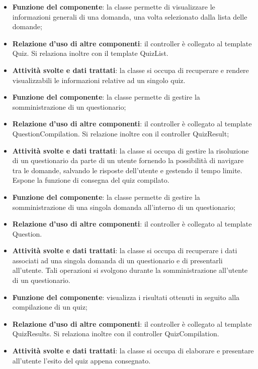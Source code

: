 \begin{itemize}
	\item\textbf{Funzione del componente}: la classe permette di visualizzare le informazioni generali di una domanda, una volta selezionato dalla lista delle domande;
	\item\textbf{Relazione d'uso di altre componenti}: il controller è collegato al template Quiz. Si relaziona inoltre con il template QuizList.
	\item\textbf{Attività svolte e dati trattati}: la classe si occupa di recuperare e rendere visualizzabili le informazioni relative ad un singolo quiz.
\end{itemize}


\begin{itemize}
	\item\textbf{Funzione del componente}: la classe permette di gestire la somministrazione di un questionario;
	\item\textbf{Relazione d'uso di altre componenti}: il controller è collegato al template QuestionCompilation. Si relazione inoltre con il controller QuizResult;
	\item\textbf{Attività svolte e dati trattati}: la classe si occupa di gestire la risoluzione di un questionario da parte di un utente fornendo la possibilità di navigare tra le domande, salvando le risposte dell'utente e gestendo il tempo limite. Espone la funzione di consegna del quiz compilato.
\end{itemize}


\begin{itemize}
	\item\textbf{Funzione del componente}: la classe permette di gestire la somministrazione di una singola domanda all'interno di un questionario;
	\item\textbf{Relazione d'uso di altre componenti}: il controller è collegato al template Question.
	\item\textbf{Attività svolte e dati trattati}: la classe si occupa di recuperare i dati associati ad una singola domanda di un questionario e di presentarli all'utente. Tali operazioni si svolgono durante la somministrazione all'utente di un questionario.
\end{itemize}


\begin{itemize}
	\item\textbf{Funzione del componente}: visualizza i risultati ottenuti in seguito alla compilazione di un quiz;
	\item\textbf{Relazione d'uso di altre componenti}: il controller è collegato al template QuizResults. Si relaziona inoltre con il controller QuizCompilation.
	\item\textbf{Attività svolte e dati trattati}: la classe si occupa di elaborare e presentare all'utente l'esito del quiz appena consegnato.
\end{itemize}

